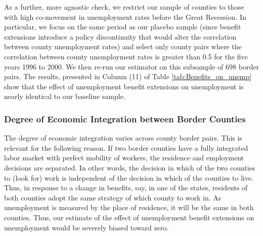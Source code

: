 \documentclass[12pt]{article}
\newcommand{\1}{\mathbf{1}}
\begin{document}
As a further, more agnostic check, we restrict our sample of counties to those with high co-movement in unemployment rates before the Great Recession. In particular, we focus on the same period as our placebo sample (since benefit extensions introduce a policy discontinuity that would alter the correlation between county unemployment rates) and select only county pairs where the correlation between county unemployment rates is greater than 0.5 for the five years 1996 to 2000. We then re-run our estimator on this subsample of $698$ border pairs. The results, presented in Column (11) of Table \ref{tab:Benefits_on_unemp} show that the effect of unemployment benefit extensions on unemployment is nearly identical to our baseline sample.


\subsubsection{Degree of Economic Integration between Border Counties}

The degree of economic integration varies across county border pairs. This is relevant for the following reason. If two border counties have a fully integrated labor market with perfect mobility of workers, the residence and employment decisions are separated. In other words, the decision in which of the two counties to (look for) work is independent of the decision in which of the counties to live. Thus, in response to a change in benefits, say, in one of the states, residents of both counties adopt the same strategy of which county to work in. As unemployment is measured by the place of residence, it will be the same in both counties. Thus, our estimate of the effect of unemployment benefit extensions on unemployment would be severely biased toward zero.
\end{document}
